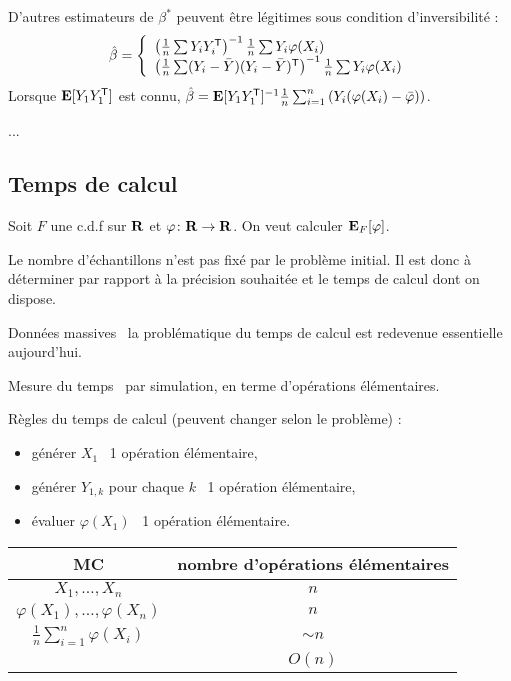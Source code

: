 	\begin{rem}
		D'autres estimateurs de $\beta^*$ peuvent être légitimes sous condition d'inversibilité :
		$$\hat{\beta} = \left\{ \begin{array}{l}
			\left( \frac{1}{n} \sum Y_i Y_i^\mathsf{T} \right)^{-1} \frac{1}{n} \sum Y_i \varphi(X_i) \\
			\left( \frac{1}{n} \sum (Y_i - \bar{Y}) (Y_i - \bar{Y})^\mathsf{T} \right)^{-1} \frac{1}{n} \sum Y_i \varphi(X_i)
			\end{array} \right.$$
		Lorsque $\mathbf{E}[Y_1 Y_1^\mathsf{T}]$ est connu, $\hat{\beta} = \mathbf{E}[Y_1 Y_1^\mathsf{T}]^{-1} \frac{1}{n} \sum_{i = 1}^n \left( Y_i (\varphi(X_i) - \bar{\varphi}) \right)$.
	\end{rem}
	
	...


\subsection{Temps de calcul}

	Soit $F$ une c.d.f sur $\mathbf{R}$ et $\varphi \colon \mathbf{R} \to \mathbf{R}$.
	On veut calculer $\mathbf{E}_F[\varphi]$.
	
	Le nombre d'échantillons n'est pas fixé par le problème initial.
	Il est donc à déterminer par rapport à la précision souhaitée et le temps de calcul dont on dispose.
	
	Données massives \textrightarrow\ la problématique du temps de calcul est redevenue essentielle aujourd'hui.
	
	Mesure du temps \textrightarrow\ par simulation, en terme d'opérations élémentaires.
	
	Règles du temps de calcul (peuvent changer selon le problème) :
	\begin{itemize}
		\item[\textbullet] générer $X_1$ \textrightarrow\ 1 opération élémentaire,
		\item[\textbullet] générer $Y_{1,k}$ pour chaque $k$ \textrightarrow\ 1 opération élémentaire,
		\item[\textbullet] évaluer $\varphi(X_1)$ \textrightarrow\ 1 opération élémentaire.\\
	\end{itemize}
	
	\begin{tabular}{c|c}
	MC & nombre d'opérations élémentaires \\
	\hline
	$X_1,\ldots,X_n$ & $n$ \\
	$\varphi(X_1),\ldots,\varphi(X_n)$ & $n$ \\
	$\frac{1}{n} \sum_{i = 1}^n \varphi(X_i)$ & $\sim  n$\\
	 & $O(n)$\\
	\end{tabular}
	
